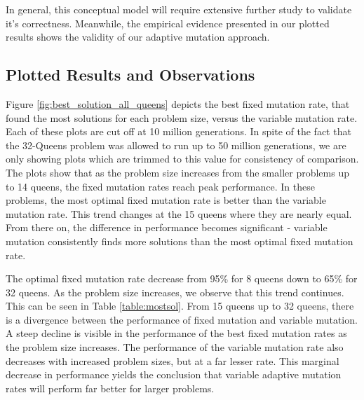 \documentclass[conference]{IEEEtran}
\begin{document}
In general, this conceptual model will require extensive further study to validate it's correctness. Meanwhile, the empirical evidence presented in our plotted results shows the validity of our adaptive mutation approach.

\subsection{Plotted Results and Observations}
Figure \ref{fig:best_solution_all_queens} depicts the best fixed mutation rate, that found the most solutions for each problem size, versus the variable mutation rate. Each of these plots are cut off at 10 million generations. In spite of the fact that the 32-Queens problem was allowed to run up to 50 million generations, we are only showing plots which are trimmed to this value for consistency of comparison. The plots show that as the problem size increases from the smaller problems up to 14 queens, the fixed mutation rates reach peak performance. In these problems, the most optimal fixed mutation rate is better than the variable mutation rate. This trend changes at the 15 queens where they are nearly equal. From there on, the difference in performance becomes significant - variable mutation consistently finds more solutions than the most optimal fixed mutation rate. 

The optimal fixed mutation rate decrease from 95\% for 8 queens down to 65\% for 32 queens. As the problem size increases, we observe that this trend continues. This can be seen in Table \ref{table:mostsol}. From 15 queens up to 32 queens, there is a divergence between the performance of fixed mutation and variable mutation. A steep decline is visible in the performance of the best fixed mutation rates as the problem size increases. The performance of the variable mutation rate also decreases with increased problem sizes, but at a far lesser rate. This marginal decrease in performance yields the conclusion that variable adaptive mutation rates will perform far better for larger problems.
\end{document}
